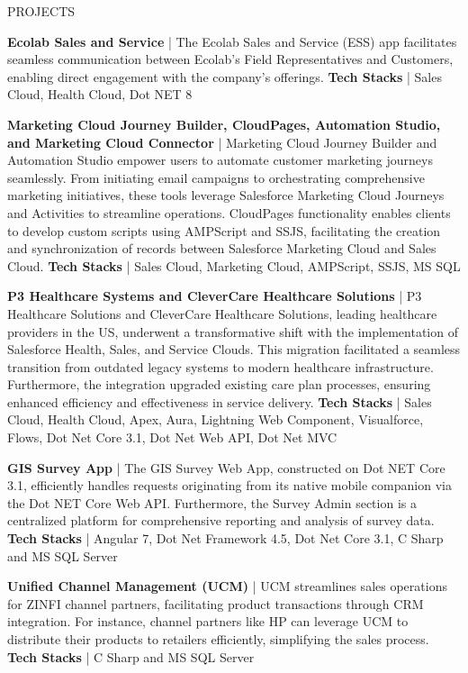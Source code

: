 \documentclass[11pt]{resume}
\begin{document}
    \begin{rSection}{PROJECTS}
        \vspace{-1.25em}
        \item \textbf{Ecolab Sales and Service} | {The Ecolab Sales and Service (ESS) app facilitates seamless communication between Ecolab's Field Representatives and Customers, enabling direct engagement with the company's offerings.} \newline
        \textbf{Tech Stacks} | {Sales Cloud, Health Cloud, Dot NET 8}

        \item \textbf{Marketing Cloud Journey Builder, CloudPages, Automation Studio, and Marketing Cloud Connector} | {Marketing Cloud Journey Builder and Automation Studio empower users to automate customer marketing journeys seamlessly. From initiating email campaigns to orchestrating comprehensive marketing initiatives, these tools leverage Salesforce Marketing Cloud Journeys and Activities to streamline operations. CloudPages functionality enables clients to develop custom scripts using AMPScript and SSJS, facilitating the creation and synchronization of records between Salesforce Marketing Cloud and Sales Cloud.} \newline
        \textbf{Tech Stacks} | {Sales Cloud, Marketing Cloud, AMPScript, SSJS, MS SQL}

        \item \textbf{P3 Healthcare Systems and CleverCare Healthcare Solutions} | {P3 Healthcare Solutions and CleverCare Healthcare Solutions, leading healthcare providers in the US, underwent a transformative shift with the implementation of Salesforce Health, Sales, and Service Clouds. This migration facilitated a seamless transition from outdated legacy systems to modern healthcare infrastructure. Furthermore, the integration upgraded existing care plan processes, ensuring enhanced efficiency and effectiveness in service delivery.} \newline
        \textbf{Tech Stacks} | {Sales Cloud, Health Cloud, Apex, Aura, Lightning Web Component, Visualforce, Flows, Dot Net Core 3.1, Dot Net Web API, Dot Net MVC}

        \item \textbf{GIS Survey App} | {The GIS Survey Web App, constructed on Dot NET Core 3.1, efficiently handles requests originating from its native mobile companion via the Dot NET Core Web API. Furthermore, the Survey Admin section is a centralized platform for comprehensive reporting and analysis of survey data.} \newline
        \textbf{Tech Stacks} | {Angular 7, Dot Net Framework 4.5, Dot Net Core 3.1, C Sharp and MS SQL Server}

        \item \textbf{Unified Channel Management (UCM)} | {UCM streamlines sales operations for ZINFI channel partners, facilitating product transactions through CRM integration. For instance, channel partners like HP can leverage UCM to distribute their products to retailers efficiently, simplifying the sales process.} \newline
        \textbf{Tech Stacks} | {C Sharp and MS SQL Server}
    \end{rSection}
\end{document}
